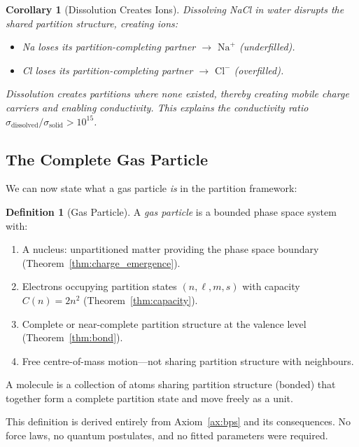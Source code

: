 \documentclass[twocolumn,10pt,a4paper]{article}
\theoremstyle{plain}
\newtheorem{corollary}[theorem]{Corollary}
\theoremstyle{definition}
\newtheorem{definition}[theorem]{Definition}
\theoremstyle{remark}
\begin{document}
\begin{corollary}[Dissolution Creates Ions]
\label{cor:dissolution}
Dissolving NaCl in water disrupts the shared partition structure, creating ions:
\begin{itemize}
    \item Na loses its partition-completing partner $\rightarrow$ $\mathrm{Na}^+$ (underfilled).
    \item Cl loses its partition-completing partner $\rightarrow$ $\mathrm{Cl}^-$ (overfilled).
\end{itemize}
Dissolution \emph{creates} partitions where none existed, thereby creating mobile charge carriers and enabling conductivity. This explains the conductivity ratio $\sigma_{\mathrm{dissolved}}/\sigma_{\mathrm{solid}} > 10^{15}$.
\end{corollary}

\subsection{The Complete Gas Particle}

We can now state what a gas particle \emph{is} in the partition framework:

\begin{definition}[Gas Particle]
\label{def:gas_particle}
A \emph{gas particle} is a bounded phase space system with:
\begin{enumerate}
    \item A nucleus: unpartitioned matter providing the phase space boundary (Theorem~\ref{thm:charge_emergence}).
    \item Electrons occupying partition states $(n, \ell, m, s)$ with capacity $C(n) = 2n^2$ (Theorem~\ref{thm:capacity}).
    \item Complete or near-complete partition structure at the valence level (Theorem~\ref{thm:bond}).
    \item Free centre-of-mass motion---not sharing partition structure with neighbours.
\end{enumerate}
A molecule is a collection of atoms sharing partition structure (bonded) that together form a complete partition state and move freely as a unit.
\end{definition}

This definition is derived entirely from Axiom~\ref{ax:bps} and its consequences. No force laws, no quantum postulates, and no fitted parameters were required.

\end{document}
